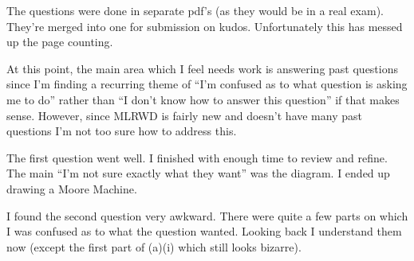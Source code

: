 \documentclass[10pt,\jkfside,a4paper]{article}
\begin{document}
The questions were done in separate pdf's (as they would be in a real exam). They're merged into one for 
submission on kudos. Unfortunately this has messed up the page counting.

At this point, the main area which I feel needs work is answering past questions since I'm finding 
a recurring theme of ``I'm confused as to what question is asking me to do'' rather than ``I don't know 
how to answer this question'' if that makes sense.
However, since MLRWD is fairly new and doesn't have many past questions  I'm not too sure how to address 
this.

The first question went well. I finished with enough time to review and refine. The main 
``I'm not sure exactly what they want'' was the diagram. I ended up drawing a Moore Machine.

I found the second question very awkward. There were quite a few parts on which I was confused 
as to what the question wanted. Looking back I understand them now (except the first part of 
(a)(i) which still looks bizarre).




\end{document}
